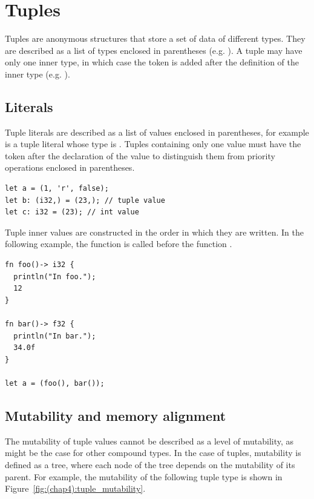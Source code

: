 \section {Tuples}

Tuples are anonymous structures that store a set of data of different types.
They are described as a list of types enclosed in parentheses (e.g.
). A tuple may have only one inner type, in which case
the token \token{,} is added after the definition of the inner type (e.g.
).

\subsection {Literals}

Tuple literals are described as a list of values enclosed in parentheses, for
example  is a tuple literal whose type is . Tuples containing only one value must have the token \token{,}
after the declaration of the value to distinguish them from priority operations
enclosed in parentheses.

\begin{lstlisting}[style=coloredverbatim]
let a = (1, 'r', false);
let b: (i32,) = (23,); // tuple value
let c: i32 = (23); // int value
\end{lstlisting}

\noindent Tuple inner values are constructed in the order in which they are
written. In the following example, the function  is called before
the function .

\begin{lstlisting}[style=coloredverbatim]
fn foo()-> i32 {
  println("In foo.");
  12
}

fn bar()-> f32 {
  println("In bar.");
  34.0f
}

let a = (foo(), bar());
\end{lstlisting}

\subsection {Mutability and memory alignment}%
\label{sec:tuple_mutability}

The mutability of tuple values cannot be described as a level of mutability, as
might be the case for other compound types. In the case of tuples, mutability is
defined as a tree, where each node of the tree depends on the mutability of its
parent. For example, the mutability of the following tuple type  is shown in Figure~\ref{fig:(chap4):tuple_mutability}.


